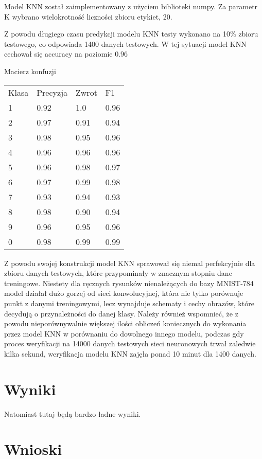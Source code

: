 \documentclass{article}
\begin{document}
Model KNN został zaimplementowany z użyciem biblioteki numpy. Za parametr K wybrano wielokrotność liczności zbioru etykiet, 20.

Z powodu długiego czasu predykcji modelu KNN testy wykonano na 10\% zbioru testowego, co odpowiada 1400 danych testowych.
W tej sytuacji model KNN cechował się accuracy na poziomie $0.96$

Macierz konfuzji 

\begin{table}[]
\begin{tabular}{llll}
Klasa & Precyzja & Zwrot & F1   \\
1     & 0.92     & 1.0   & 0.96 \\
2     & 0.97     & 0.91  & 0.94 \\
3     & 0.98     & 0.95  & 0.96 \\
4     & 0.96     & 0.96  & 0.96 \\
5     & 0.96     & 0.98  & 0.97 \\
6     & 0.97     & 0.99  & 0.98 \\
7     & 0.93     & 0.94  & 0.93 \\
8     & 0.98     & 0.90  & 0.94 \\
9     & 0.96     & 0.95  & 0.96 \\
0     & 0.98     & 0.99  & 0.99
\end{tabular}
\end{table}

Z powodu swojej konstrukcji model KNN sprawował się niemal perfekcyjnie dla zbioru danych testowych, które przypominały w znacznym stopniu dane treningowe. Niestety dla ręcznych rysunków nienależących do bazy MNIST-784 model działał dużo gorzej od sieci konwolucyjnej, która nie tylko porównuje punkt z danymi treningowymi, lecz wynajduje schematy i cechy obrazów, które decydują o przynależności do danej klasy. Należy również wspomnieć, że z powodu nieporównywalnie większej ilości obliczeń koniecznych do wykonania przez model KNN w porównaniu do dowolnego innego modelu, podczas gdy proces weryfikacji na 14000 danych testowych sieci neuronowych trwał zaledwie kilka sekund, weryfikacja modelu KNN zajęła ponad 10 minut dla 1400 danych.


\section{Wyniki}

Natomiast tutaj będą bardzo ładne wyniki.

\section{Wnioski}
\end{document}
